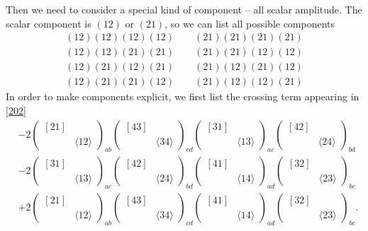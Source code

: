 \documentclass[12pt]{article}
\newcommand{\avg}[1]{\langle #1 \rangle}
\begin{document}
Then we need to consider a special kind of component -- all scalar amplitude. The scalar component is $(12)$ or $(21)$, so we can list all possible components
\begin{gather}
    (12)(12)(12)(12)\qquad (21)(21)(21)(21)\\
    (12)(12)(21)(21)\qquad (21)(21)(12)(12)\\
    (12)(21)(12)(21)\qquad (21)(12)(21)(12)\\
    (12)(21)(21)(12)\qquad (21)(12)(12)(21)
\end{gather}
In order to make components explicit, we first list the crossing term appearing in \eqref{202}
\begin{align}
    &-2\begin{pmatrix}
        [21] & \\
         & \avg{12}
    \end{pmatrix}_{ab}\begin{pmatrix}
        [43] & \\
         & \avg{34}
    \end{pmatrix}_{cd}\begin{pmatrix}
        [31] & \\
         & \avg{13}
    \end{pmatrix}_{ac}\begin{pmatrix}
        [42] & \\
         & \avg{24}
    \end{pmatrix}_{bd}  \\
    &-2\begin{pmatrix}
        [31] & \\
         & \avg{13}
    \end{pmatrix}_{ac}\begin{pmatrix}
        [42] & \\
         & \avg{24}
    \end{pmatrix}_{bd}\begin{pmatrix}
        [41] & \\
         & \avg{14}
    \end{pmatrix}_{ad}\begin{pmatrix}
        [32] & \\
         & \avg{23}
    \end{pmatrix}_{bc} \\
    &+2\begin{pmatrix}
        [21] & \\
         & \avg{12}
    \end{pmatrix}_{ab}\begin{pmatrix}
        [43] & \\
         & \avg{34}
    \end{pmatrix}_{cd}\begin{pmatrix}
        [41] & \\
         & \avg{14}
    \end{pmatrix}_{ad}\begin{pmatrix}
        [32] & \\
         & \avg{23}
    \end{pmatrix}_{bc}.
\end{align}
\end{document}
